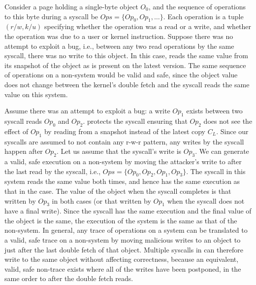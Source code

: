 Consider a page holding a single-byte object $O_0$, and the
sequence of operations to this byte during a \midas syscall be
$Ops = \{Op_0, Op_1, \dots \}$.
Each operation is a tuple $(r/w, k/u)$ specifying whether the
operation was a read or a write, and whether the operation was due to
a user or kernel instruction.
Suppose there was no attempt to exploit a \tocttou bug, i.e., between
any two read operations by the same syscall, there was no write to
this object.
In this case, \midas reads the same value from its snapshot of the
object as is present on the latest version.
The same sequence of operations on a non-\midas system would be valid and
safe, since the object value does not change between the kernel's double
fetch and the syscall reads the same value on this system.

%
Assume there was an attempt to exploit a \tocttou bug:
a write $Op_1$ exists between two syscall reads $Op_0$ and $Op_2$.
\midas protects the syscall ensuring that $Op_2$ does not see the
effect of $Op_1$ by reading from a snapshot instead of the latest
copy $C_L$.
Since our syscalls are assumed to not contain any r-w-r pattern,
any writes by the syscall happen after $Op_2$.
Let us assume that the syscall's write is $Op_3$.
We can generate a valid, safe execution on a non-\midas system
by moving the attacker's write to after the last read by the
syscall, i.e., $Ops = \{Op_0, Op_2, Op_1, Op_3\}$.
The syscall in this system reads the same value both times, and
hence has the same execution as that in the \midas case.
The value of the object when the syscall completes is that
written by $Op_3$ in both cases (or that written by $Op_1$ when
the syscall does not have a final write).
Since the syscall has the same execution and the final value of
the object is the same, the execution of the \midas system
is the same as that of the non-\midas system.
In general, any trace of operations on a \midas system can
be translated  to a valid, safe trace on a non-\midas system
by moving malicious writes to an object to just after the last
double fetch of that object.
Multiple syscalls in \midas can therefore write to the same object
without affecting
correctness, because an equivalent, valid, safe non-\midas trace
exists where all of the writes have been postponed, in the same order
to after the double fetch reads.

